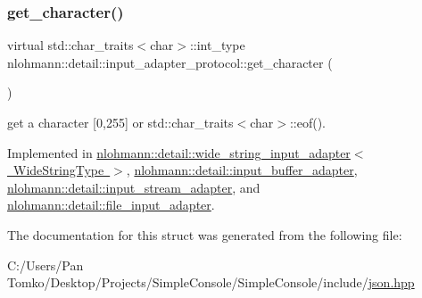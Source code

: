 \subsubsection{\texorpdfstring{get\_character()}{get\_character()}}
{\footnotesize\ttfamily virtual std\+::char\+\_\+traits$<$char$>$\+::int\+\_\+type nlohmann\+::detail\+::input\+\_\+adapter\+\_\+protocol\+::get\+\_\+character (\begin{DoxyParamCaption}{ }\end{DoxyParamCaption})\hspace{0.3cm}{\ttfamily [pure virtual]}}



get a character \mbox{[}0,255\mbox{]} or std\+::char\+\_\+traits$<$char$>$\+::eof(). 



Implemented in \mbox{\hyperlink{classnlohmann_1_1detail_1_1wide__string__input__adapter_abb62b34cf77e557ce5321b7f2490c3b0}{nlohmann\+::detail\+::wide\+\_\+string\+\_\+input\+\_\+adapter$<$ Wide\+String\+Type $>$}}, \mbox{\hyperlink{classnlohmann_1_1detail_1_1input__buffer__adapter_ae9e195b04f3551fafb0925aafba00124}{nlohmann\+::detail\+::input\+\_\+buffer\+\_\+adapter}}, \mbox{\hyperlink{classnlohmann_1_1detail_1_1input__stream__adapter_ae0760af923583de6354725e901d1869d}{nlohmann\+::detail\+::input\+\_\+stream\+\_\+adapter}}, and \mbox{\hyperlink{classnlohmann_1_1detail_1_1file__input__adapter_a0d4ff48617c8f63c30babdfd09482329}{nlohmann\+::detail\+::file\+\_\+input\+\_\+adapter}}.



The documentation for this struct was generated from the following file\+:\begin{DoxyCompactItemize}
\item 
C\+:/\+Users/\+Pan Tomko/\+Desktop/\+Projects/\+Simple\+Console/\+Simple\+Console/include/\mbox{\hyperlink{json_8hpp}{json.\+hpp}}\end{DoxyCompactItemize}

